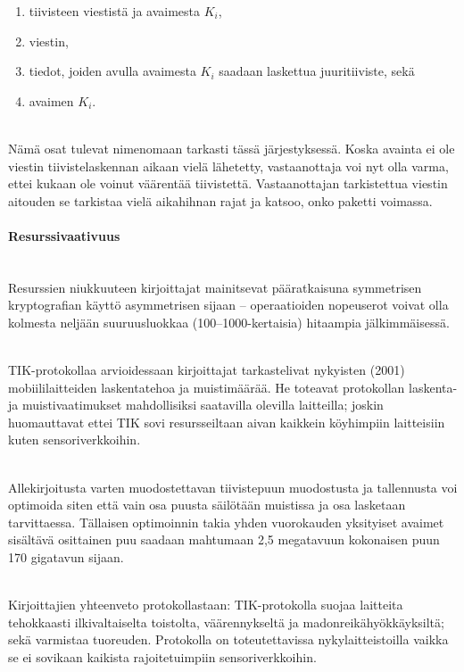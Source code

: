 \documentclass[finnish]{tktltiki2}
\theoremstyle{definition}
\theoremstyle{remark}
\begin{document}
\begin{enumerate}
\item tiivisteen viestistä ja avaimesta $K_i$,
\item viestin,
\item tiedot, joiden avulla avaimesta $K_i$ saadaan laskettua juuritiiviste, sekä
\item avaimen $K_i$.
\end{enumerate}

\noindent \\
Nämä osat tulevat nimenomaan tarkasti tässä järjestyksessä. Koska avainta ei ole viestin tiivistelaskennan aikaan vielä lähetetty, vastaanottaja voi nyt olla varma, ettei kukaan ole voinut väärentää tiivistettä. Vastaanottajan tarkistettua viestin aitouden se tarkistaa vielä aikahihnan rajat ja katsoo, onko paketti voimassa.

\paragraph{Resurssivaativuus} 
\noindent \\
Resurssien niukkuuteen kirjoittajat mainitsevat pääratkaisuna symmetrisen kryptografian käyttö asymmetrisen sijaan – operaatioiden nopeuserot voivat olla kolmesta neljään suuruusluokkaa (100--1000-kertaisia) hitaampia jälkimmäisessä.

\noindent \\
TIK-protokollaa arvioidessaan kirjoittajat tarkastelivat nykyisten (2001) mobiililaitteiden laskentatehoa ja muistimäärää. He toteavat protokollan laskenta- ja muistivaatimukset mahdollisiksi saatavilla olevilla laitteilla; joskin huomauttavat ettei TIK sovi resursseiltaan aivan kaikkein köyhimpiin laitteisiin kuten sensoriverkkoihin.

\noindent \\
Allekirjoitusta varten muodostettavan tiivistepuun muodostusta ja tallennusta voi optimoida siten että vain osa puusta säilötään muistissa ja osa lasketaan tarvittaessa. Tällaisen optimoinnin takia yhden vuorokauden yksityiset avaimet sisältävä osittainen puu saadaan mahtumaan 2,5 megatavuun kokonaisen puun 170 gigatavun sijaan.

\noindent \\
Kirjoittajien yhteenveto protokollastaan: TIK-protokolla suojaa laitteita tehokkaasti ilkivaltaiselta toistolta, väärennykseltä ja madonreikähyökkäyksiltä; sekä varmistaa tuoreuden. Protokolla on toteutettavissa nykylaitteistoilla vaikka se ei sovikaan kaikista rajoitetuimpiin sensoriverkkoihin.
\end{document}
